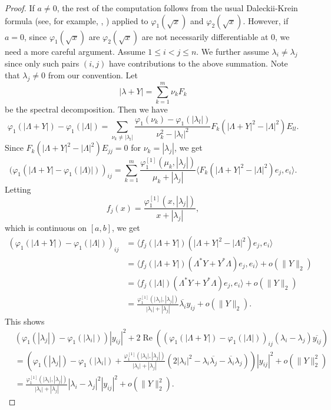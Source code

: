 \documentclass[12pt]{article}
\theoremstyle{definition}
\numberwithin{equation}{section}
\renewcommand{\Re}{\operatorname{Re}}
\newcommand{\inpr}[2]{\langle{#1,#2}\rangle}
\begin{document}
\begin{proof}
If $a\neq 0$, the rest of the computation follows from the usual Daleckii-Krein formula 
(see, for example, \cite[Theorem 3.33]{HP2014}, \cite[Theorem 2.3.1]{H2010}) 
applied to $\varphi_1(\sqrt{x})$ and $\varphi_2(\sqrt{x})$.  
However, if $a=0$, since $\varphi_1(\sqrt{x})$ are $\varphi_2(\sqrt{x})$ are not necessarily differentiable at $0$, 
we need a more careful argument.     
Assume $1\leq i<j\leq n$. 
We further assume $\lambda_i\neq \lambda_j$ since only such pairs $(i,j)$ have contributions to the above summation. 
Note that $\lambda_j\neq 0$ from our convention. 
Let 
\[|\lambda+Y|=\sum_{k=1}^m \nu_k F_k\]
be the spectral decomposition. 
Then we have 
\[\varphi_1(|\Lambda+Y|)-\varphi_1(|\Lambda|)=\sum_{\nu_k\neq |\lambda_l|}
\frac{\varphi_1(\nu_k)-\varphi_1(|\lambda_l|)}{\nu_k^2-|\lambda_l|^2}F_k(|\Lambda+Y|^2-|\Lambda|^2)E_{ll}.\]
Since $F_k(|\Lambda+Y|^2-|\Lambda|^2)E_{jj}=0$ for $\nu_k=|\lambda_j|$, we get 
\[(\varphi_1(|\Lambda+Y|-\varphi_1(|\Lambda)|))_{ij}=\sum_{k=1}^m\frac{\varphi^{[1]}_1(\mu_k,|\lambda_j|)}{\mu_k+|\lambda_j|}
\inpr{F_k(|\Lambda+Y|^2-|\Lambda|^2)e_j}{e_i}.\]
Letting
\[f_j(x)=\frac{\varphi^{[1]}_1(x,|\lambda_j|)}{x+|\lambda_j|},\]
which is continuous on $[a,b]$, we get 
\begin{align*}
(\varphi_1(|\Lambda+Y|)-\varphi_1(|\Lambda|))_{ij}
	&=\inpr{f_j(|\Lambda+Y|)(|\Lambda+Y|^2-|\Lambda|^2)e_j}{e_i}  \\
	&=\inpr{f_j(|\Lambda+Y|)(\Lambda^*Y+Y^*\Lambda)e_j}{e_i}+o(\|Y\|_2)  \\
	&=\inpr{f_j(|\Lambda|)(\Lambda^*Y+Y^*\Lambda)e_j}{e_i}+o(\|Y\|_2)  \\
	&=\frac{\varphi^{[1]}_1(|\lambda_i|,|\lambda_j|)}{|\lambda_i|+|\lambda_j|}\overline{\lambda_i}y_{ij}+o(\|Y\|_2). 
\end{align*}
This shows 
\begin{align*}
	&(\varphi_1(|\lambda_j|)-\varphi_1(|\lambda_i|)) |y_{ij}|^2
	+2\Re\left( (\varphi_1(|\Lambda+Y|)-\varphi_1(|\Lambda|))_{ij}(\lambda_i-\lambda_j)\overline{y_{ij}}\right)\\
	&=\left(\varphi_1(|\lambda_j|)-\varphi_1(|\lambda_i|) 
	+\frac{\varphi^{[1]}_1(|\lambda_i|,|\lambda_j|)}{|\lambda_i|+|\lambda_j|}
	(2|\lambda_i|^2-\lambda_i\overline{\lambda_j}-\overline{\lambda_i}\lambda_j)\right)|y_{ij}|^2
	+o(\|Y\|_2^2) \\
	&=\frac{\varphi^{[1]}_1(|\lambda_i|,|\lambda_j|)}{|\lambda_i|+|\lambda_j|}
	|\lambda_i-\lambda_j|^2|y_{ij}|^2+o(\|Y\|_2^2).
	\end{align*}
	

\end{proof}
\end{document}
